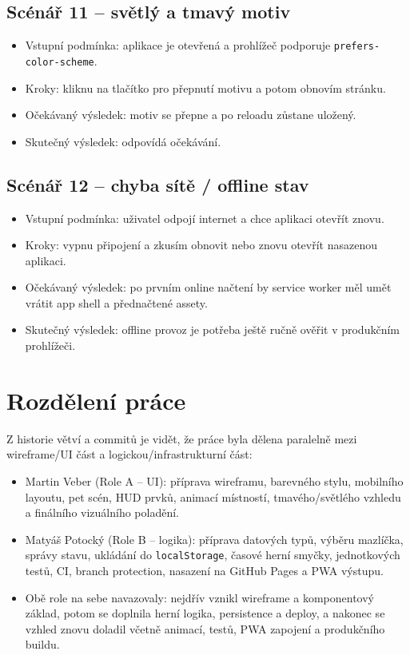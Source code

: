 \documentclass[12pt,a4paper]{article}
\begin{document}
\subsection*{Scénář 11 -- světlý a tmavý motiv}
\begin{itemize}[leftmargin=2em]
  \item Vstupní podmínka: aplikace je otevřená a prohlížeč podporuje \texttt{prefers-color-scheme}.
  \item Kroky: kliknu na tlačítko pro přepnutí motivu a potom obnovím stránku.
  \item Očekávaný výsledek: motiv se přepne a po reloadu zůstane uložený.
  \item Skutečný výsledek: odpovídá očekávání.
\end{itemize}

\subsection*{Scénář 12 -- chyba sítě / offline stav}
\begin{itemize}[leftmargin=2em]
  \item Vstupní podmínka: uživatel odpojí internet a chce aplikaci otevřít znovu.
  \item Kroky: vypnu připojení a zkusím obnovit nebo znovu otevřít nasazenou aplikaci.
  \item Očekávaný výsledek: po prvním online načtení by service worker měl umět vrátit app shell a přednačtené assety.
  \item Skutečný výsledek: offline provoz je potřeba ještě ručně ověřit v produkčním prohlížeči.
\end{itemize}

\section{Rozdělení práce}

Z historie větví a commitů je vidět, že práce byla dělena paralelně mezi wireframe/UI část a logickou/infrastrukturní část:

\begin{itemize}[leftmargin=2em]
  \item Martin Veber (Role A -- UI): příprava wireframu, barevného stylu, mobilního layoutu, pet scén, HUD prvků, animací místností, tmavého/světlého vzhledu a finálního vizuálního poladění.
  \item Matyáš Potocký (Role B -- logika): příprava datových typů, výběru mazlíčka, správy stavu, ukládání do \texttt{localStorage}, časové herní smyčky, jednotkových testů, CI, branch protection, nasazení na GitHub Pages a PWA výstupu.
  \item Obě role na sebe navazovaly: nejdřív vznikl wireframe a komponentový základ, potom se doplnila herní logika, persistence a deploy, a nakonec se vzhled znovu doladil včetně animací, testů, PWA zapojení a produkčního buildu.
\end{itemize}
\end{document}
